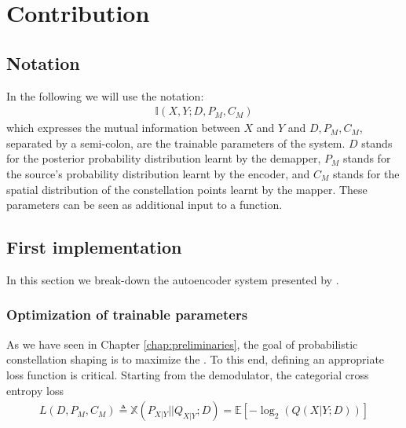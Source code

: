 \chapter{Contribution}\label{chap:contribution}
\section{Notation}
In the following we will use the notation:
\begin{align*}
	\mathbb{I} \left(X , Y; D, P_M, C_M \right)
\end{align*}
which expresses the mutual information between $X$ and $Y$ and $D, P_M, C_M$, separated by a semi-colon, are the trainable parameters of the system. $D$ stands for the posterior probability distribution learnt by the demapper, $P_M$ stands for the source's probability distribution learnt by the encoder, and $C_M$ stands for the spatial distribution of the constellation points learnt by the mapper. These parameters can be seen as additional input to a function.

\section{First implementation}
In this section we break-down the autoencoder system presented by \citet{Stark}.
\subsection{Optimization of trainable parameters}
As we have seen in Chapter \ref{chap:preliminaries}, the goal of probabilistic constellation shaping is to maximize the . To this end, defining an appropriate loss function is critical. Starting from the demodulator, the categorial cross entropy loss
\begin{align}
	L(D, P_M, C_M) \triangleq \mathbb{X}(P_{X|Y}||Q_{X|Y}; D) = \mathbb{E}\left[-\log_2(Q(X|Y;D))\right] 
\end{align}

